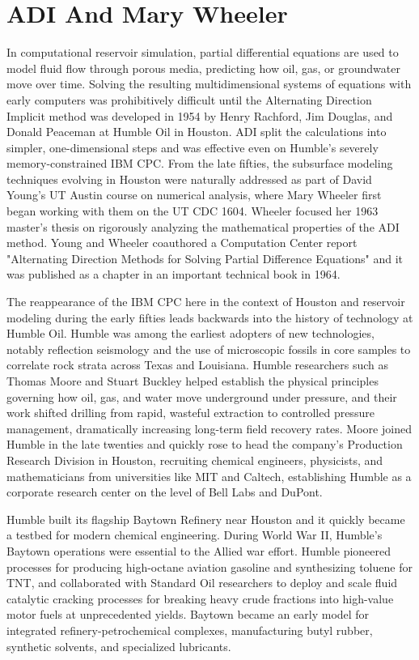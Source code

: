 \chapter{ADI And Mary Wheeler}

In computational reservoir simulation, partial differential equations are used to model fluid flow through porous media, predicting how oil, gas, or groundwater move over time. Solving the resulting multidimensional systems of equations with early computers was prohibitively difficult until the Alternating Direction Implicit method was developed in 1954 by Henry Rachford, Jim Douglas, and Donald Peaceman at Humble Oil in Houston. ADI split the calculations into simpler, one-dimensional steps and was effective even on Humble's severely memory-constrained IBM CPC. From the late fifties, the subsurface modeling techniques evolving in Houston were naturally addressed as part of David Young’s UT Austin course on numerical analysis, where Mary Wheeler first began working with them on the UT CDC 1604. Wheeler focused her 1963 master's thesis on rigorously analyzing the mathematical properties of the ADI method. Young and Wheeler coauthored a Computation Center report "Alternating Direction Methods for Solving Partial Difference Equations" and it was published as a chapter in an important technical book in 1964. \cite{wheelerAlternatingDirectionMethods1964}

The reappearance of the IBM CPC here in the context of Houston and reservoir modeling during the early fifties leads backwards into the history of technology at Humble Oil. Humble was among the earliest adopters of new technologies, notably reflection seismology and the use of microscopic fossils in core samples to correlate rock strata across Texas and Louisiana. Humble researchers such as Thomas Moore and Stuart Buckley helped establish the physical principles governing how oil, gas, and water move underground under pressure, and their work shifted drilling from rapid, wasteful extraction to controlled pressure management, dramatically increasing long-term field recovery rates. Moore joined Humble in the late twenties and quickly rose to head the company’s Production Research Division in Houston, recruiting chemical engineers, physicists, and mathematicians from universities like MIT and Caltech, establishing Humble as a corporate research center on the level of Bell Labs and DuPont. \cite{prattExxonTransformingEnergy2013} \cite{larsonHistoryHumbleOil1959}

Humble built its flagship Baytown Refinery near Houston and it quickly became a testbed for modern chemical engineering. During World War II, Humble’s Baytown operations were essential to the Allied war effort. Humble pioneered processes for producing high-octane aviation gasoline and synthesizing toluene for TNT, and collaborated with Standard Oil researchers to deploy and scale fluid catalytic cracking processes for breaking heavy crude fractions into high-value motor fuels at unprecedented yields. Baytown became an early model for integrated refinery-petrochemical complexes, manufacturing butyl rubber, synthetic solvents, and specialized lubricants.

